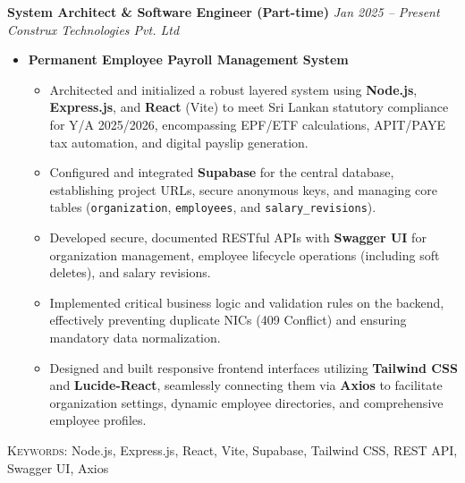 \noindent
\textbf{System Architect \& Software Engineer (Part-time)} \hfill \textit{Jan 2025 -- Present}\\
\noindent
\textit{Construx Technologies Pvt. Ltd}\\[0.05em]

\begin{itemize}[leftmargin=*, itemsep=0.3em, topsep=0.01em]

    \item \textbf{Permanent Employee Payroll Management System}
    \begin{itemize}[leftmargin=1.5em, itemsep=0.2em, topsep=0.1em]
        \item Architected and initialized a robust layered system using \textbf{Node.js}, \textbf{Express.js}, and \textbf{React} (Vite) to meet Sri Lankan statutory compliance for Y/A 2025/2026, encompassing EPF/ETF calculations, APIT/PAYE tax automation, and digital payslip generation.
        \item Configured and integrated \textbf{Supabase} for the central database, establishing project URLs, secure anonymous keys, and managing core tables (\texttt{organization}, \texttt{employees}, and \texttt{salary\_revisions}).
        \item Developed secure, documented RESTful APIs with \textbf{Swagger UI} for organization management, employee lifecycle operations (including soft deletes), and salary revisions.
        \item Implemented critical business logic and validation rules on the backend, effectively preventing duplicate NICs (409 Conflict) and ensuring mandatory data normalization.
        \item Designed and built responsive frontend interfaces utilizing \textbf{Tailwind CSS} and \textbf{Lucide-React}, seamlessly connecting them via \textbf{Axios} to facilitate organization settings, dynamic employee directories, and comprehensive employee profiles.
    \end{itemize}

\end{itemize}

\vspace{-0.1em}
\noindent\small
\textsc{Keywords:} Node.js, Express.js, React, Vite, Supabase, Tailwind CSS, REST API, Swagger UI, Axios
\normalsize
